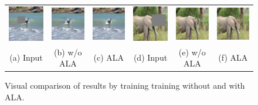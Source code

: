 \begin{figure}[!ht]
\centering
\small
\setlength\tabcolsep{1pt}
\begin{tabular}{cccccc}
\includegraphics[width=.17\textwidth]{figures/ALA/000000063154_input_image.jpg}&
\includegraphics[width=.17\textwidth]{figures/ALA/000000063154_synthesized_image.jpg}&
\includegraphics[width=.17\textwidth]{figures/ALA/000000063154_synthesized_image-1.jpg}&
\includegraphics[width=.17\textwidth]{figures/ALA/000000475779_input_image.jpg}&
\includegraphics[width=.17\textwidth]{figures/ALA/000000475779_synthesized_image.jpg}&
\includegraphics[width=.17\textwidth]{figures/ALA/000000475779_synthesized_image-1.jpg}\\
(a) Input & (b) w/o ALA & (c) ALA & (d) Input & (e) w/o ALA & (f) ALA \\
\end{tabular}
\caption{Visual comparison of results by training training without and with ALA.}
\label{fig:ala}
\end{figure}  

